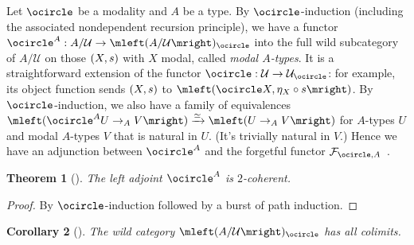 \documentclass[10pt,a4paper]{article}
\newtheorem{thm}{Theorem}[section]
\newtheorem{cor}[thm]{Corollary}
\theoremstyle{definition}
\theoremstyle{remark}
\newcommand{\U}{\mathcal{U}}
\newcommand{\F}{\mathcal F}
\newcommand{\0}{\mathbf{0}}
\newcommand{\1}{\mathbf{1}}
\newcommand{\2}{\mathbf{2}}
\newcommand{\modal}{{\ensuremath{\ocircle}}}
\newcommand{\myhref}[2]{%
  \href{#1}{\textcolor{blue!30!black}{#2}}%
}
\begin{document}
Let $\modal$ be a modality and $A$ be a type. By $\modal$-induction (including the associated nondependent recursion principle), we have a functor $\modal^A : A/\U \to \mleft(A/\U\mright)_{\modal}$ into the full wild subcategory of $A/\U$ on those $\mleft(X,s\mright)$ with $X$ modal, called \emph{modal $A$-types}. It is a straightforward extension of the functor $\modal : \U \to \U_{\modal}$: for example, its object function sends $\mleft(X,s\mright)$ to $\mleft(\modal{X} , \eta_X \circ s \mright)$. By $\modal$-induction, we also have a family of equivalences $\mleft(\modal^A{U} \to_A V\mright) \xrightarrow{\simeq} \mleft(U \to_A V \mright)$ for $A$-types $U$ and modal $A$-types $V$ that is natural in $U$. (It's trivially natural in $V$.) Hence we have an adjunction between $\modal^A$ and the forgetful functor $\F_{\modal,A}$~\cite[\myhref{https://github.com/PHart3/colimits-agda/blob/lapc-lmcs/HoTT-Agda/theorems/modality/Mod-Cos-adj.agda\#L34}{Mod-cos-adj}]{2cohagda-pub}.
\begin{thm}[{\cite[\myhref{https://github.com/PHart3/colimits-agda/blob/lapc-lmcs/HoTT-Agda/theorems/modality/Mod-Cos-adj.agda\#L52}{Mod-cos-adj-2coh}]{2cohagda-pub}}] \label{mod2coh}
The left adjoint $\modal^A$ is $2$-coherent.
\end{thm}
\begin{proof}
By $\modal$-induction followed by a burst of path induction.
\end{proof}
\begin{cor}[{\cite[\myhref{https://github.com/PHart3/colimits-agda/blob/lapc-lmcs/HoTT-Agda/theorems/modality/Mod-colim.agda}{Mod-colim}]{2cohagda-pub}}]  \label{modcolbuild}
The wild category $\mleft(A/\U\mright)_{\modal}$ has all colimits.
\end{cor}
\end{document}
